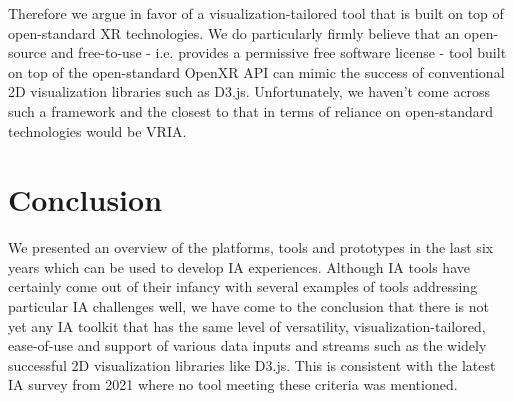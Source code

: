 \documentclass{vgtc}                          %
\begin{document}
Therefore we argue in favor of a visualization-tailored tool that is built on
top of open-standard XR technologies. We do particularly firmly believe that
an open-source and free-to-use - i.e. provides a permissive free software
license - tool built on top of the open-standard OpenXR API can mimic the
success of conventional 2D visualization libraries such as D3.js.
Unfortunately, we haven't come across such a framework and the closest to that
in terms of reliance on open-standard technologies would be VRIA.

\section{Conclusion}
We presented an overview of the platforms, tools and prototypes in the last six
years which can be used to develop IA experiences. Although IA tools have
certainly come out of their infancy with several examples of tools addressing
particular IA challenges well, we have come to the conclusion that there is not
yet any IA toolkit that has the same level of versatility,
visualization-tailored, ease-of-use and support of various data inputs and
streams such as the widely successful 2D visualization libraries like D3.js.
This is consistent with the latest IA survey from 2021 \cite{survey_of_ia}
where no tool meeting these criteria was mentioned.

\printbibliography
\end{document}
